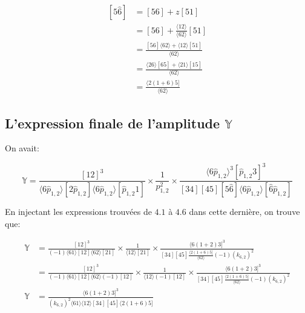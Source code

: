 \documentclass[12pt, a4paper]{article}
\begin{document}
		\subsection{}
		\begin{equation}
			\begin{split}
				[5\hat{6}]
				&=[56] + z[51] \\
				&=[56] + \frac{\langle 12 \rangle}{\langle 62 \rangle}[51] \\
				&=\frac{[56]\langle 62 \rangle +\langle 12 \rangle [51]} {\langle 62 \rangle}\\
				&=\frac{\langle 26 \rangle[65] +\langle 21 \rangle [15]} {\langle 62 \rangle}\\
				&=\frac{\langle 2 (1+6) 5]}{\langle 62 \rangle}
			\end{split}
		\end{equation}
		
		\subsection{L'expression finale de l'amplitude $\mathbb{Y}$}
		On avait:
		
		\[\mathbb{Y}=\frac{[12]^3}{\langle 6 \hat{p}_{1,2} \rangle[2\hat{p}_{1,2}]\langle 6 \hat{p}_{1,2} \rangle[\hat{p}_{1,2}1]} 
		\times \frac{1}{p_{1,2}^2} \times
		\frac{\langle 6 \hat{p}_{1,2} \rangle^3 [\hat{p}_{1,2}3]^3}{[34][45][5\hat{6}]\langle 6 \hat{p}_{1,2} \rangle[\hat{6}\hat{p}_{1,2}]}\]
		
		En injectant les expressions trouvées de $4.1$ à $4.6$ dans cette dernière, on trouve que:
		
		\begin{equation}
			\begin{split}
				\mathbb{Y}
				&=\frac{[12]^3}{(-1) \langle 61 \rangle [12]\langle 62 \rangle [21]} 
				\times \frac{1}{\langle 12 \rangle [21]} \times
				\frac{\langle 6(1+2)3]^3}{[34][45]\frac{\langle 2 (1+6) 5]}{\langle 62 \rangle}(-1)(k_{6,2})^2}\\
				&=\frac{[12]^3}{(-1) \langle 61 \rangle [12]\langle 62 \rangle (-1)[12]} 
				\times \frac{1}{\langle 12 \rangle (-1)[12]} \times
				\frac{\langle 6(1+2)3]^3}{[34][45]\frac{\langle 2 (1+6) 5]}{\langle 62 \rangle}(-1)(k_{6,2})^2}\\
				\mathbb{Y}&=\frac{\langle 6(1+2)3]^3}{(k_{6,2})^2 \langle 61 \rangle \langle 12 \rangle [34][45]\langle 2 (1+6) 5]}
			\end{split}
		\end{equation}
		
\end{document}
